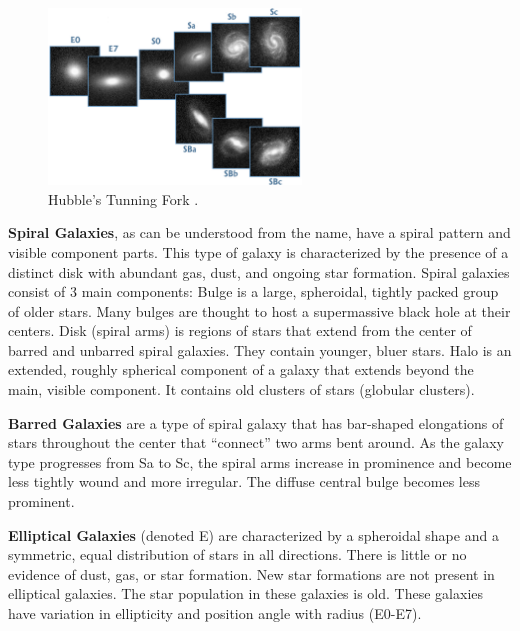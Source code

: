 \begin{figure}[htbp]
    \centering
    \includegraphics[width=0.6\textwidth]{obrazky-figures/02-theoretical-basis/tfork_upscaled.png}
    \caption{Hubble's Tunning Fork \cite{Hickson2016ASTR505}.}
    \label{fig:fork}
\end{figure}

\textbf{Spiral Galaxies}, as can be understood from the name, have a spiral pattern and visible component parts. This type of galaxy is characterized by the presence of a distinct disk with abundant gas, dust, and ongoing star formation. Spiral galaxies consist of 3 main components: Bulge is a large, spheroidal, tightly packed group of older stars. Many bulges are thought to host a supermassive black hole at their centers. Disk (spiral arms) is regions of stars that extend from the center of barred and unbarred spiral galaxies. They contain younger, bluer stars. Halo is an extended, roughly spherical component of a galaxy that extends beyond the main, visible component. It contains old clusters of stars (globular clusters).

\medskip

\textbf{Barred Galaxies} are a type of spiral galaxy that has bar-shaped elongations of stars throughout the center that “connect” two arms bent around. As the galaxy type progresses from Sa to Sc, the spiral arms increase in prominence and become less tightly wound and more irregular. The diffuse central bulge becomes less prominent.

\medskip

\textbf{Elliptical Galaxies} (denoted E) are characterized by a spheroidal shape and a symmetric, equal distribution of stars in all directions. There is little or no evidence of dust, gas, or star formation. New star formations are not present in elliptical galaxies. The star population in these galaxies is old. These galaxies have variation in ellipticity and position angle with radius (E0-E7).

